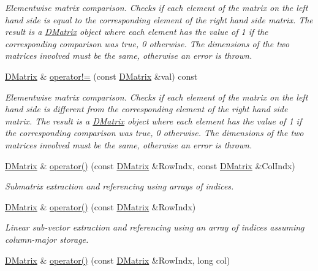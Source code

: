 \begin{DoxyCompactItemize}
\begin{DoxyCompactList}\small\item\em Elementwise matrix comparison. Checks if each element of the matrix on the left hand side is equal to the corresponding element of the right hand side matrix. The result is a \hyperlink{classDMatrix}{DMatrix} object where each element has the value of 1 if the corresponding comparison was true, 0 otherwise. The dimensions of the two matrices involved must be the same, otherwise an error is thrown. \item\end{DoxyCompactList}\item 
\hyperlink{classDMatrix}{DMatrix} \& \hyperlink{classDMatrix_a50d36066d7917dee27b67665b91d78a3}{operator!=} (const \hyperlink{classDMatrix}{DMatrix} \&val) const 
\begin{DoxyCompactList}\small\item\em Elementwise matrix comparison. Checks if each element of the matrix on the left hand side is different from the corresponding element of the right hand side matrix. The result is a \hyperlink{classDMatrix}{DMatrix} object where each element has the value of 1 if the corresponding comparison was true, 0 otherwise. The dimensions of the two matrices involved must be the same, otherwise an error is thrown. \item\end{DoxyCompactList}\item 
\hyperlink{classDMatrix}{DMatrix} \& \hyperlink{classDMatrix_a2716e6ec24ea80068a5baec55e98c370}{operator()} (const \hyperlink{classDMatrix}{DMatrix} \&RowIndx, const \hyperlink{classDMatrix}{DMatrix} \&ColIndx)
\begin{DoxyCompactList}\small\item\em Submatrix extraction and referencing using arrays of indices. \item\end{DoxyCompactList}\item 
\hyperlink{classDMatrix}{DMatrix} \& \hyperlink{classDMatrix_a160cbc57bd615ceb60ebdb500371a37c}{operator()} (const \hyperlink{classDMatrix}{DMatrix} \&RowIndx)
\begin{DoxyCompactList}\small\item\em Linear sub-\/vector extraction and referencing using an array of indices assuming column-\/major storage. \item\end{DoxyCompactList}\item 
\hyperlink{classDMatrix}{DMatrix} \& \hyperlink{classDMatrix_aad182b5dbdaa8ec1911904639d5626de}{operator()} (const \hyperlink{classDMatrix}{DMatrix} \&RowIndx, long col)

\end{DoxyCompactItemize}
